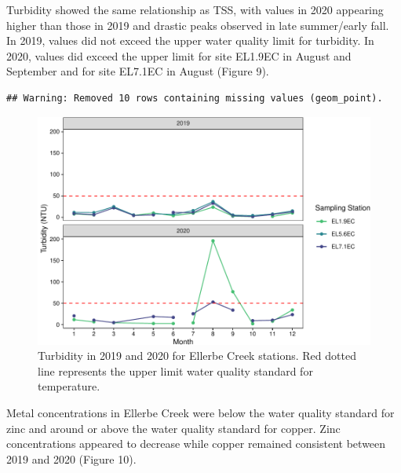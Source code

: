 \documentclass[
  12pt,
]{article}
\begin{document}
Turbidity showed the same relationship as TSS, with values in 2020
appearing higher than those in 2019 and drastic peaks observed in late
summer/early fall. In 2019, values did not exceed the upper water
quality limit for turbidity. In 2020, values did exceed the upper limit
for site EL1.9EC in August and September and for site EL7.1EC in August
(Figure 9).

\begin{verbatim}
## Warning: Removed 10 rows containing missing values (geom_point).
\end{verbatim}

\begin{figure}
\centering
\includegraphics{August_Lindborg_ENV872_Project_files/figure-latex/unnamed-chunk-11-1.pdf}
\caption{Turbidity in 2019 and 2020 for Ellerbe Creek stations. Red
dotted line represents the upper limit water quality standard for
temperature.}
\end{figure}

Metal concentrations in Ellerbe Creek were below the water quality
standard for zinc and around or above the water quality standard for
copper. Zinc concentrations appeared to decrease while copper remained
consistent between 2019 and 2020 (Figure 10).
\end{document}
